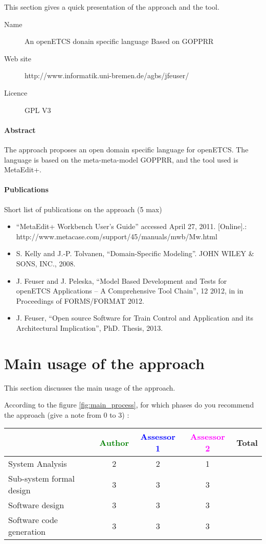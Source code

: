 This section gives a quick presentation of the approach and the tool.

\begin{description}
\item[Name] An openETCS donain specific language Based on GOPPRR
\item[Web site] http://www.informatik.uni-bremen.de/agbs/jfeuser/
\item[Licence] GPL V3
\end{description}

\paragraph{Abstract} 
The approach proposes an open  domain specific language for
openETCS. The language is based on the meta-meta-model  GOPPRR, and the
tool used is MetaEdit+.


\paragraph{Publications} Short list of publications on the approach (5 max)
\begin{itemize}
\item ``MetaEdit+ Workbench User’s Guide'' accessed April 27, 2011. [Online].:
http://www.metacase.com/support/45/manuals/mwb/Mw.html
\item S. Kelly and J.-P. Tolvanen, ``Domain-Specific Modeling''. JOHN WILEY \& SONS, INC.,
2008.
\item J. Feuser and J. Peleska, ``Model Based Development and Tests for openETCS Applications
– A Comprehensive Tool Chain'', 12 2012, in in Proceedings of FORMS/FORMAT 2012.
\item J. Feuser, ``Open source Software for Train Control and
  Application and its Architectural Implication'', PhD. Thesis, 2013.
\end{itemize}


\section{Main usage of the approach}
\label{main_usage}
This section discusses the main usage of the approach.

According to the figure \ref{fig:main_process}, for which phases do you recommend the approach (give a note from 0 to  3) :

\begin{tabular}{|l | c | c | c | c|}
\hline
& \textcolor{green}{Author} & \textcolor{blue}{Assessor 1} & \textcolor{magenta}{Assessor 2} & Total \\
\hline 
System Analysis &
2 &2 & 1&  \\
\hline
Sub-system formal design &3 &3 & 3& \\
\hline
Software design &3 &3 & 3& \\
\hline
Software code generation &3 &3 & 3& \\
\hline
\end{tabular}

